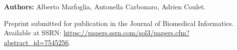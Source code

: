 
\begin{paperheader}
\textbf{Authors:} Alberto Marfoglia, Antonella Carbonaro, Adrien Coulet.\par
Preprint submitted for publication in the Journal of Biomedical Informatics. Available at SSRN: \url{https://papers.ssrn.com/sol3/papers.cfm?abstract_id=7545256}.
\end{paperheader}

